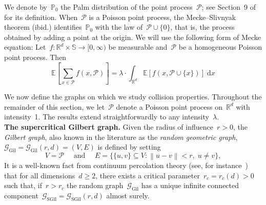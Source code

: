 \documentclass[a4paper,11pt]{article}
\newcommand{\EE}{\mathbb{E}}
\newcommand{\RR}{\mathbb{R}}
\newcommand\norm[1]{\left\lVert#1\right\rVert}
\theoremstyle{definition}
\begin{document}
We denote by~$\mathbb{P}_0$ the Palm distribution of the point process~$\mathcal P$; see Section~9 of~\cite{LastPenrose2017} for its definition. When~$\mathcal P$ is a Poisson point process, the Mecke–Slivnyak theorem (ibid.) identifies~$\mathbb{P}_0$ with the law of~$\mathcal P \cup \{0\}$, that is, the process obtained by adding a point at the origin. We will use the following form of Mecke equation: Let~$f: \RR^d \times \mathbb S \to [0,\infty)$ be measurable and~$\mathcal P$ be a homogeneous Poisson point process. Then
$$ \EE \left[ \sum_{x \in \mathcal P}f(x,\mathcal P) \right] = \lambda \cdot \int_{\mathbb R^d}\EE[ f(x,\mathcal P \cup \{x\} ) ] \; \mathrm{d}x $$

We now define the graphs on which we study collision properties. Throughout the remainder of this section, we let~$\mathcal P$ denote a Poisson point process on~$\mathbb{R}^d$ with intensity~1. The results extend straightforwardly to any intensity~$\lambda$. \\

\noindent \textbf{The supercritical Gilbert graph.} Given the radius of influence~$r > 0$, the \emph{Gilbert graph}, also known in the literature as the \emph{random geometric graph},~$\mathcal G_\mathrm{Gil} = \mathcal{G}_\mathrm{Gil}(r,d) = (V,E)$ is defined by setting
$$ V = \mathcal P \quad \text{ and } \quad  E = \{ \{u,v\} \subseteq V: \norm{ u - v} < r, \; u \neq v \}, $$
It is a well-known fact from continuum percolation theory (see, for instance~\cite{Penrose2003}) that for all dimensions~$d \ge 2$, there exists a critical parameter~$r_c = r_c(d) > 0$ such that, if~$r >r_c$ the random graph~$ \mathcal G_\mathrm{Gil}$ has a unique infinite connected component~$\mathcal G_\mathrm{SGil} =\mathcal G_\mathrm{SGil}(r,d)$ almost surely. \\

\end{document}
